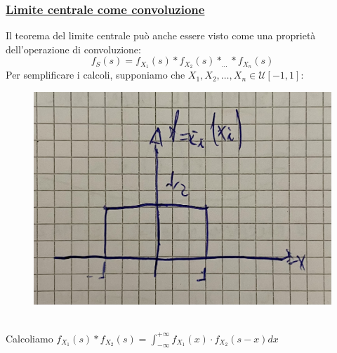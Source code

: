 \documentclass{article}
\begin{document}
\subsubsection{\underline{Limite centrale come convoluzione}}
Il teorema del limite centrale può anche essere visto come una proprietà dell'operazione di convoluzione:
\[f_S(s) = f_{X_1}(s) * f_{X_2}(s) * _{\dots} * f_{X_n}(s)\]
Per semplificare i calcoli, supponiamo che $X_1, X_2, \dots, X_n \in \mathcal{U}\left[ -1, 1 \right]$:
\begin{figure}[H]
\centering
\includegraphics[scale=0.13]{images/84.jpeg}
\end{figure} ~\\
Calcoliamo $f_{X_1}(s)*f_{X_2}(s) = \int_{-\infty}^{+\infty} f_{X_1}(x) \cdot f_{X_2}(s-x) dx$
\end{document}
